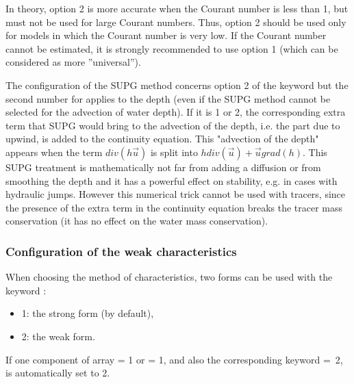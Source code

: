 In theory, option 2 is more accurate when the Courant number is less than 1,
but must not be used for large Courant numbers.
Thus, option 2 should be used only for models in which the Courant number is
very low.
If the Courant number cannot be estimated, it is strongly recommended
to use option 1 (which can be considered as more ''universal'').

The configuration of the SUPG method concerns option 2 of the keyword
 but the second number for 
applies to the depth (even if the SUPG method cannot be selected for the
advection of water depth).
If it is 1 or 2, the corresponding extra term that SUPG would bring
to the advection of the depth,
i.e. the part due to upwind, is added to the continuity equation.
This "advection of the depth" appears when the term $div(h\vec{u})$ is split
into $h div(\vec{u}) + \vec{u}grad(h)$.
This SUPG treatment is mathematically not far from adding a diffusion
or from smoothing the depth and it has a powerful effect on stability,
e.g. in cases with hydraulic jumps.
However this numerical trick cannot be used with tracers,
since the presence of the extra term in the continuity equation breaks
the tracer mass conservation (it has no effect on the water mass conservation).

\subsubsection{Configuration of the weak characteristics}

When choosing the method of characteristics, two forms can be used with the
keyword :

\begin{itemize}
\item 1: the strong form (by default),
\item 2: the weak form.
\end{itemize}

If one component of array  = 1 or
 = 1,
and also the corresponding keyword
 =~2,
 is automatically set to 2.\\

